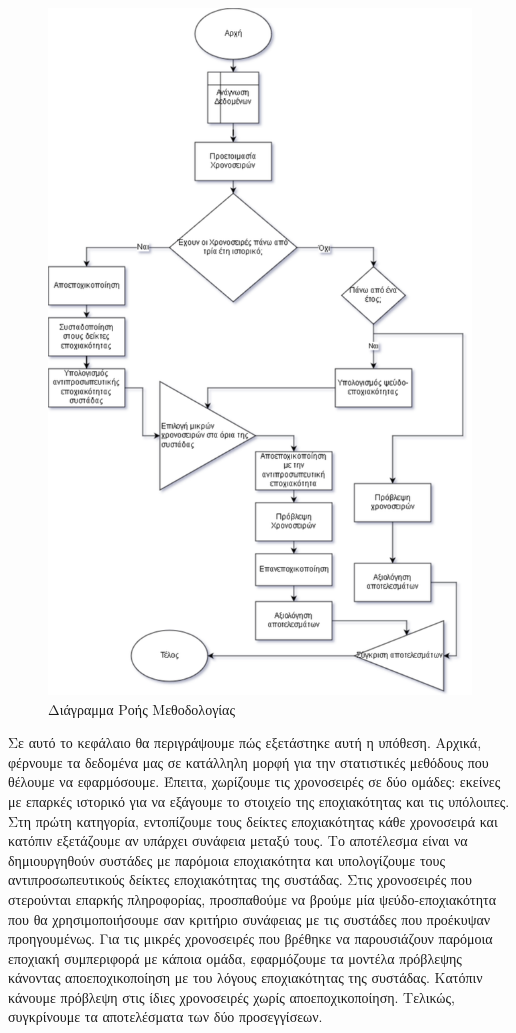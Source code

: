\begin{figure}[t!]
\includegraphics[scale=0.5]{figures/methodology.png}
\centering
\caption{Διάγραμμα Ροής Μεθοδολογίας}
\label{MethodologyFC}
\end{figure} 

Σε αυτό το κεφάλαιο θα περιγράψουμε πώς εξετάστηκε αυτή η υπόθεση. Αρχικά, φέρνουμε τα δεδομένα μας σε κατάλληλη μορφή για την στατιστικές μεθόδους που θέλουμε να εφαρμόσουμε. Έπειτα, χωρίζουμε τις χρονοσειρές σε δύο ομάδες: εκείνες με επαρκές ιστορικό για να εξάγουμε το στοιχείο της εποχιακότητας και τις υπόλοιπες. Στη πρώτη κατηγορία, εντοπίζουμε τους δείκτες εποχιακότητας κάθε χρονοσειρά και κατόπιν εξετάζουμε αν υπάρχει συνάφεια μεταξύ τους. Το αποτέλεσμα είναι να δημιουργηθούν συστάδες με παρόμοια εποχιακότητα και υπολογίζουμε τους αντιπροσωπευτικούς δείκτες εποχιακότητας της συστάδας. Στις χρονοσειρές που στερούνται επαρκής πληροφορίας, προσπαθούμε να βρούμε μία ψεύδο-εποχιακότητα που θα χρησιμοποιήσουμε σαν κριτήριο συνάφειας με τις συστάδες που προέκυψαν προηγουμένως. Για τις μικρές χρονοσειρές που βρέθηκε να παρουσιάζουν παρόμοια εποχιακή συμπεριφορά με κάποια ομάδα, εφαρμόζουμε τα μοντέλα πρόβλεψης κάνοντας αποεποχικοποίηση με του λόγους εποχιακότητας της συστάδας. Κατόπιν κάνουμε πρόβλεψη στις ίδιες χρονοσειρές χωρίς αποεποχικοποίηση. Τελικώς, συγκρίνουμε τα αποτελέσματα των δύο προσεγγίσεων. 

